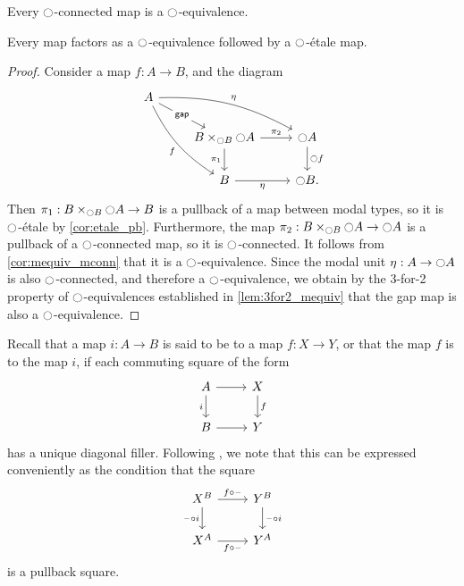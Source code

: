 \documentclass[9pt,twosided]{amsart}
\begin{document}
\begin{cor}\label{cor:mequiv_mconn}
Every ${\ocircle}$-connected map is a ${\ocircle}$-equivalence.
\end{cor}

\begin{lem}\label{lem:rfs_factor}
Every map factors as a ${\ocircle}$-equivalence followed by a ${\ocircle}$-\'etale map.
\end{lem}

\begin{proof}
Consider a map $f:A\to B$, and the diagram
\begin{equation*}
\begin{tikzcd}
A \arrow[ddr,bend right=15,swap,"f"] \arrow[drr,bend left=15,"\modalunit"] \arrow[dr,"\mathsf{gap}" description] \\
& B\times_{\modal B} \modal A \arrow[d,swap,"\pi_1"] \arrow[r,"\pi_2"] & \modal A \arrow[d,"\modal f"] \\
& B \arrow[r,swap,"\modalunit"] & \modal B.
\end{tikzcd}
\end{equation*}
Then $\pi_1:B\times_{{\ocircle} B} {\ocircle} A\to B$ is a pullback of a map between modal types, so it is ${\ocircle}$-\'etale by \cref{cor:etale_pb}. Furthermore, the map $\pi_2:B\times_{{\ocircle} B}{\ocircle} A\to {\ensuremath{\ocircle}} A$ is a pullback of a ${\ocircle}$-connected map, so it is ${\ocircle}$-connected. It follows from \cref{cor:mequiv_mconn} that it is a ${\ocircle}$-equivalence. Since the modal unit ${\eta_{}} :A\to{\ensuremath{\ocircle}} A$ is also ${\ocircle}$-connected, and therefore a ${\ocircle}$-equivalence, we obtain by the 3-for-2 property of ${\ocircle}$-equivalences established in \cref{lem:3for2_mequiv} that the gap map is also a ${\ocircle}$-equivalence.
\end{proof}

Recall that a map $i:A\to B$ is said to be  to a map $f:X\to Y$, or that the map $f$ is  to the map $i$,
if each commuting square of the form
\begin{equation*}
\begin{tikzcd}
A \arrow[r] \arrow[d,swap,"i"] & X \arrow[d,"f"] \\
B \arrow[r] & Y
\end{tikzcd}
\end{equation*}
has a unique diagonal filler. Following \cite{AnelBiedermanFinsterJoyal}, we note that this can be expressed conveniently as the condition that the square
\begin{equation*}
\begin{tikzcd}
X^B \arrow[r,"f\circ\blank"] \arrow[d,swap,"\blank\circ i"] & Y^B \arrow[d,"\blank\circ i"] \\
X^A \arrow[r,swap,"f\circ\blank"] & Y^A
\end{tikzcd}
\end{equation*}
is a pullback square.
\end{document}
